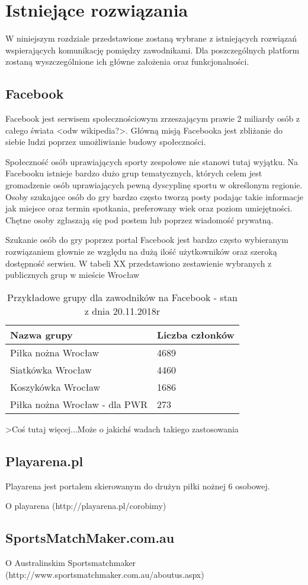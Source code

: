 \chapter{Istniejące rozwiązania}

W niniejszym rozdziale przedstawione zostaną wybrane z istniejących rozwiązań wspierających komunikację pomiędzy zawodnikami. Dla poszczególnych platform zostaną wyszczególnione ich główne założenia oraz funkcjonalności.


\section{Facebook}

Facebook jest serwisem społecznościowym zrzeszającym prawie 2 miliardy osób z całego świata <odw wikipedia?>. Główną misją Facebooka jest zbliżanie do siebie ludzi poprzez umożliwianie budowy społeczności.

Społeczność osób uprawiających sporty zespołowe nie stanowi tutaj wyjątku. Na Facebooku istnieje bardzo dużo grup tematycznych, których celem jest gromadzenie osób uprawiających pewną dyscyplinę sportu w określonym regionie. Osoby szukające osób do gry bardzo często tworzą posty podając takie informacje jak miejsce oraz termin spotkania, preferowany wiek oraz poziom umiejętności. Chętne osoby zgłaszają się pod postem lub poprzez wiadomość prywatną. 

Szukanie osób do gry poprzez portal Facebook jest bardzo często wybieranym rozwiązaniem głownie ze względu na dużą ilość użytkowników oraz szeroką dostępność serwisu. W tabeli XX przedstawiono zestawienie wybranych z publicznych grup w mieście Wrocław


\begin{table}[htb]
\centering\small
\caption{Przykładowe grupy dla zawodników na Facebook - stan z dnia 20.11.2018r}
\label{tab:szablon}
\begin{tabularx}{\linewidth}{|p{.55\linewidth}|X|}\hline
Nazwa grupy & Liczba członków \\ \hline\hline
Piłka nożna Wrocław & 4689  \\ \hline
Siatkówka Wrocław & 4460  \\ \hline
Koszykówka Wrocław & 1686 \\ \hline
Piłka nożna Wrocław - dla PWR & 273  \\ \hline
\end{tabularx}
\end{table}

>Coś tutaj więcej...Może o jakichś wadach takiego zastosowania



\section{Playarena.pl}

Playarena jest portalem skierowanym do drużyn piłki nożnej 6 osobowej. 

O playarena (http://playarena.pl/corobimy)



\section{SportsMatchMaker.com.au}

O Australinskim Sportsmatchmaker (http://www.sportsmatchmaker.com.au/aboutus.aspx)
